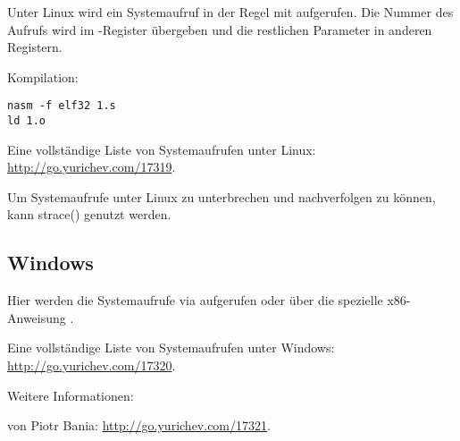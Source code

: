 Unter Linux wird ein Systemaufruf in der Regel mit  aufgerufen.
Die Nummer des Aufrufs wird im \EAX-Register übergeben und die restlichen Parameter in anderen Registern.

%


Kompilation:

\begin{lstlisting}
nasm -f elf32 1.s
ld 1.o
\end{lstlisting}

Eine vollständige Liste von Systemaufrufen unter Linux: \url{http://go.yurichev.com/17319}.

Um Systemaufrufe unter Linux zu unterbrechen und nachverfolgen zu können, kann strace()
genutzt werden.

\subsection{Windows}


Hier werden die Systemaufrufe via  aufgerufen oder über die spezielle x86-Anweisung .

Eine vollständige Liste von Systemaufrufen unter Windows: \url{http://go.yurichev.com/17320}.

Weitere Informationen:

 von Piotr Bania: \url{http://go.yurichev.com/17321}.
